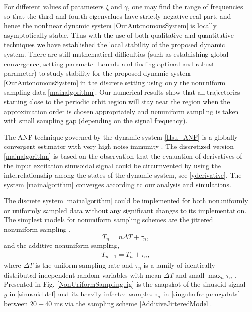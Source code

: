 \documentclass{UCF_ETD}
\begin{document}
For different values of parameters $\xi$ and $\gamma$, one may find the range of frequencies  so that the third and fourth  eigenvalues have strictly negative real part, and hence the  nonlinear dynamic system \eqref{OurAutonomousSystem} is locally asymptotically stable. Thus with the use of both qualitative and quantitative techniques we have established the local stability of the proposed dynamic system. There are still mathematical difficulties (such as establishing global convergence, setting parameter bounds and finding optimal and robust parameter) to study  stability  for the proposed dynamic system  \eqref{OurAutonomousSystem} in the discrete setting using only the nonuniform sampling data \eqref{mainalgorithm}. Our numerical results show that all trajectories starting close to the periodic orbit region will stay near the region
when the approximation order  is chosen appropriately and nonuniform sampling is taken with small sampling gap (depending on the signal frequency).

The ANF technique governed by  the dynamic system \eqref{Hsu_ANF}
 is a globally convergent estimator with very high noise immunity \cite{hsuortegadamm99}.
 The discretized version \eqref{mainalgorithm}
is based on the observation that  the evaluation of  derivatives of the input excitation sinusoidal signal %
 could be circumvented by using the interrelationship among the states of the dynamic system, see \eqref{yderivative}.
The system \eqref{mainalgorithm}
converges according to our analysis and simulations.

 The discrete system \eqref{mainalgorithm} could be implemented for both nonuniformly or uniformly sampled data without any significant changes to its implementation.
 The simplest models  for nonuniform sampling schemes  are the
 jittered nonuniform sampling \cite{tarcznski04},
   \begin{equation}\label{SimpleJitteredModel} %
T_n = n\Delta T + \tau _n,
\end{equation}
   and the %
 additive nonuniform sampling,
 \begin{eqnarray}\label{AdditiveJitteredModel}
T_{n+1} = T_n + \tau _n,
\end{eqnarray}
  where
 $\Delta T$ is the uniform sampling rate and ${\tau _n}$ is a family of identically distributed independent random variables with  mean $\Delta T$
and small $\max_n \tau_n$ \cite{unserieee, akramsiam,sunsiam}. Presented in Fig. \ref{NonUniformSampling.fig} is
the snapshot of the sinusoid signal $y$
in \eqref{sinusoid.def}
and its heavily-infected samples $z_n$ in \eqref{singularfrequencydata}
 between $20-40$ ms via the sampling scheme
 \eqref{AdditiveJitteredModel}.
\end{document}
